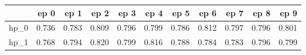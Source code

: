 \begin{tabular}{lrrrrrrrrrr}
\toprule
{} &   ep 0 &   ep 1 &   ep 2 &   ep 3 &   ep 4 &   ep 5 &   ep 6 &   ep 7 &   ep 8 &   ep 9 \\
\midrule
hp\_0 &  0.736 &  0.783 &  0.809 &  0.796 &  0.799 &  0.786 &  0.812 &  0.797 &  0.796 &  0.801 \\
hp\_1 &  0.768 &  0.794 &  0.820 &  0.799 &  0.816 &  0.788 &  0.784 &  0.783 &  0.796 &  0.799 \\
\bottomrule
\end{tabular}
